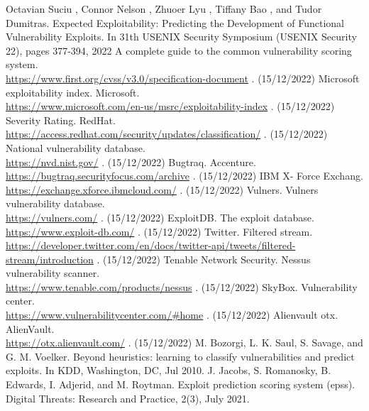 \documentclass[submit,techreq,noauthor]{eco}	%
\begin{document}
\begin{thebibliography}{99}
   Octavian Suciu , Connor Nelson , Zhuoer Lyu , Tiffany Bao , and Tudor Dumitras.
    \quad Expected Exploitability: Predicting the Development of Functional Vulnerability 
    Exploits. In 31th USENIX Security Symposium (USENIX Security 22), pages 377-394, 2022
    A complete guide to the common vulnerability scoring system.\\
      \url{https://www.first.org/cvss/v3.0/specification-document} . (15/12/2022)
    Microsoft exploitability index. Microsoft.\\
      \url{https://www.microsoft.com/en-us/msrc/exploitability-index} . (15/12/2022)
    Severity Rating. RedHat.\\
      \url{https://access.redhat.com/security/updates/classification/} . (15/12/2022)
    National vulnerability database.\\
      \url{https://nvd.nist.gov/} . (15/12/2022)
    Bugtraq. Accenture.\\
      \url{https://bugtraq.securityfocus.com/archive} . (15/12/2022)
    IBM X- Force Exchang.\\
      \url{https://exchange.xforce.ibmcloud.com/} . (15/12/2022)
    Vulners. Vulners vulnerability database.\\
      \url{https://vulners.com/} . (15/12/2022)
    ExploitDB. The exploit database.\\
      \url{https://www.exploit-db.com/} . (15/12/2022)
    Twitter. Filtered stream.\\
      \url{https://developer.twitter.com/en/docs/twitter-api/tweets/filtered-stream/introduction} . (15/12/2022)
    Tenable Network Security. Nessus vulnerability scanner.\\
      \url{https://www.tenable.com/products/nessus} . (15/12/2022)
    SkyBox. Vulnerability center.\\
      \url{https://www.vulnerabilitycenter.com/#home} . (15/12/2022)
    Alienvault otx. AlienVault.\\
      \url{https://otx.alienvault.com/} . (15/12/2022)
    M. Bozorgi, L. K. Saul, S. Savage, and G. M. Voelker. Beyond heuristics: learning to classify vulnerabilities and predict exploits. In KDD, Washington, DC, Jul 2010.
     J. Jacobs, S. Romanosky, B. Edwards, I. Adjerid, and M. Roytman. Exploit prediction scoring system (epss). Digital Threats: Research and Practice, 2(3), July 2021.
\end{thebibliography}
\end{document}
